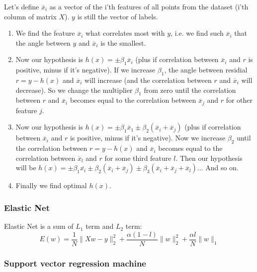 Let's define $\overline{x}_i$ as a vector of the i'th features of all points from the dataset (i'th column of matrix $X$). $y$ is still the vector of labels.
\begin{enumerate}
	\item We find the feature $\overline{x}_i$ what correlates most with $y$, i.e. we find such $\overline{x}_i$ that the angle between $y$ and $\overline{x}_i$ is the smallest.
	\item Now our hypothesis is $h(x)=\pm\beta_1\overline{x}_i$ (plus if correlation between $\overline{x}_i$ and $r$ is positive, minus if it's negative). If we increase $\beta_1$, the angle between residial $r=y-h(x)$ and $\overline{x}_i$ will increase (and  the correlation between $r$ and $\overline{x}_i$ will decrease). So we change the multiplier $\beta_1$ from zero until the correlation between $r$ and $\overline{x}_i$ becomes equal to the correlation between $\overline{x}_j$ and $r$ for other feature $j$.
	\item Now our hypothesis is $h(x)=\pm\beta_1\overline{x}_1\pm\beta_2(\overline{x}_i+\overline{x}_j)$ (plus if correlation between $\overline{x}_i$ and $r$ is positive, minus if it's negative). Now we increase $\beta_2$ until the correlation between $r=y-h(x)$ and $\overline{x}_i$ becomes equal to the correlation between $\overline{x}_l$ and $r$ for some third feature $l$. Then our hypothesis will be $h(x)=\pm\beta_1\overline{x_i}\pm\beta_2(\overline{x}_i+\overline{x}_j)\pm\beta_3(\overline{x}_i+\overline{x}_j+\overline{x}_l)$... And so on.
	\item Finally we find optimal $h(x)$.
\end{enumerate}

\subsubsection*{Elastic Net}

Elastic Net is a sum of $L_1$ term and $L_2$ term:
$$E(w)=\frac{1}{N}\|Xw-y\|_2^2+\frac{\alpha(1-l)}{N}\|w\|_2^2+\frac{\alpha l}{N}\|w\|_1$$

\subsubsection*{Support vector regression machine}

